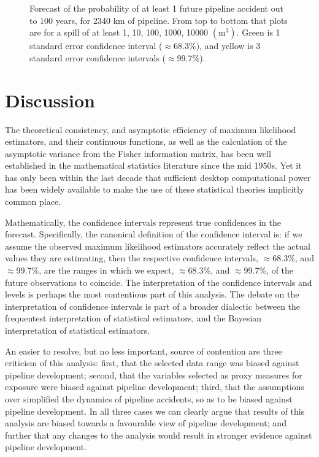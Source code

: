 \documentclass[letterpaper,10pt,oneside,final,onecolumn]{article}
\begin{document}
\begin{figure}
		\caption{Forecast of the probability of at least 1 future pipeline accident out to 100 years, for 2340 km of pipeline.
			From top to bottom that plots are for a spill of at least 1, 10, 100, 1000, 10000 $\left(\text{m}^3\right)$.
			Green is 1 standard error confidence interval ($\approx$68.3\%), and yellow is 3 standard error confidence intervals ($\approx$99.7\%).
		}\label{forecast-estimate}
	\end{figure}

	\section{Discussion}\label{discussion}
	The theoretical consistency, and asymptotic efficiency of maximum likelihood estimators, and their continuous functions, as well as the calculation of the asymptotic variance from the Fisher information matrix, has been well established in the mathematical statistics literature since the mid 1950s.
	Yet it has only been within the last decade that sufficient desktop computational power has been widely available to make the use of these statistical theories implicitly common place.
	
	Mathematically, the confidence intervals represent true confidences in the forecast.
	Specifically, the canonical definition of the confidence interval is: if we assume the observed maximum likelihood estimators accurately reflect the actual values they are estimating, then the respective confidence intervals, $\approx$68.3\%, and $\approx$99.7\%, are the ranges in which we expect, $\approx$68.3\%, and $\approx$99.7\%, of the future observations to coincide. 
	The interpretation of the confidence intervals and levels is perhaps the most contentious part of this analysis.
	The debate on the interpretation of confidence intervals is part of a broader dialectic between the frequentest interpretation of statistical estimators, and the Bayesian interpretation of statistical estimators.

	An easier to resolve, but no less important, source of contention are three criticism of this analysis:
	first, that the selected data range was biased against pipeline development;
	second, that the variables selected as proxy measures for exposure were biased against pipeline development;
	third, that the assumptions over simplified the dynamics of pipeline accidents, so as to be biased against pipeline development.
	In all three cases we can clearly argue that results of this analysis are biased towards a favourable view of pipeline development; and further that any changes to the analysis would result in stronger evidence against pipeline development.
	
\end{document}
